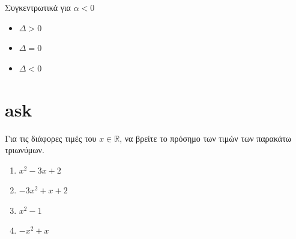 \documentclass{../../presentation}
\begin{document}
\begin{frame}{Συγκεντρωτικά για $α<0$}
  \begin{center}
    \begin{itemize}
      \item $Δ > 0$
            \begin{center}
            \end{center}

      \item $Δ = 0$
            \begin{center}
            \end{center}

      \item $Δ < 0$
            \begin{center}
            \end{center}
    \end{itemize}

  \end{center}
\end{frame}

\section{ask}

\begin{askisi}
  Για τις διάφορες τιμές του $x\in\mathbb{R}$, να βρείτε το πρόσημο των τιμών των παρακάτω τριωνύμων.
  \begin{enumerate}[<+->]
    \item $x^2-3x+2$
    \item $-3x^2+x+2$
    \item $x^2-1$
    \item $-x^2+x$
  \end{enumerate}
\end{askisi}
\end{document}

